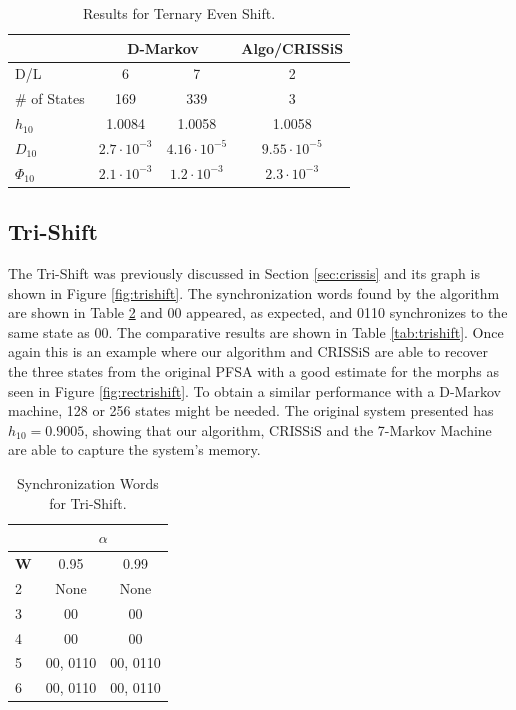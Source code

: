 {\begin{table}
\centering
\begin{tabular}{|l|c|c|c|}
\hline
 & \multicolumn{2}{c|}{\textbf{D-Markov}} & \textbf{Algo/CRISSiS}\\
 \hline
D/L & 6 & 7 & 2 \\
\hline
\# of States & 169 & 339 & 3 \\ 
$h_{10}$ & 1.0084 & 1.0058 & 1.0058 \\
$D_{10}$ & $2.7\cdot10^{-3}$ & $4.16\cdot10^{-5}$ & $9.55\cdot10^{-5}$ \\
$\Phi_{10}$  & $2.1\cdot10^{-3}$ & $1.2\cdot10^{-3}$ & $2.3\cdot10^{-3}$ \\
 \hline
\end{tabular}
\caption{Results for Ternary Even Shift. \label{tab:ternaryeven}}
\end{table}

\subsection{Tri-Shift}

The Tri-Shift was previously discussed in Section \ref{sec:crissis} and its graph is shown in Figure \ref{fig:trishift}. The synchronization words found by the algorithm are shown in Table \ref{tab:trishiftsynch} and 00 appeared, as expected, and 0110 synchronizes to the same state as 00. The comparative results are shown in Table \ref{tab:trishift}. Once again this is an example where our algorithm and CRISSiS are able to recover the three states from the original PFSA with a good estimate for the morphs as seen in Figure \ref{fig:rectrishift}. To obtain a similar performance with a D-Markov machine, 128 or 256 states might be needed. The original system presented has $h_{10} = 0.9005$, showing that our algorithm, CRISSiS and the 7-Markov Machine are able to capture the system's memory.

\begin{table}
\centering
\begin{tabular}{|l|c|c|}
\hline
 & \multicolumn{2}{c|}{\textbf{$\alpha$}}\\
 \hline
\textbf{W} & 0.95 & 0.99 \\
\hline
2 & None & None \\ 
3 & 00 & 00 \\ 
4 & 00 & 00 \\ 
5 & 00, 0110 & 00, 0110 \\
6 & 00, 0110 & 00, 0110 \\
 \hline
\end{tabular}
\caption{Synchronization Words for Tri-Shift. \label{tab:trishiftsynch}}
\end{table}


}
